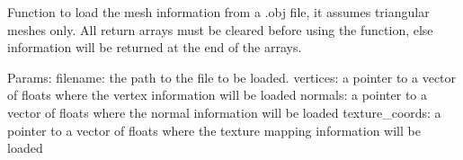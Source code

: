 Function to load the mesh information from a .obj file, it assumes triangular meshes only. All return arrays must be cleared before using the function, else information will be returned at the end of the arrays.

Params\+: filename\+: the path to the file to be loaded. vertices\+: a pointer to a vector of floats where the vertex information will be loaded normals\+: a pointer to a vector of floats where the normal information will be loaded texture\+\_\+coords\+: a pointer to a vector of floats where the texture mapping information will be loaded 